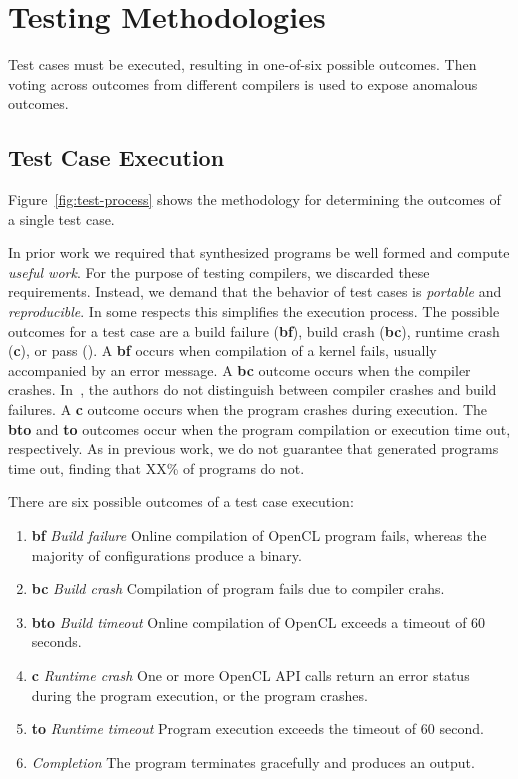 \section{Testing Methodologies}\label{sec:methodology}

Test cases must be executed, resulting in one-of-six possible outcomes. Then voting across outcomes from different compilers is used to expose anomalous outcomes.


\subsection{Test Case Execution}



Figure~\ref{fig:test-process} shows the methodology for determining the outcomes of a single test case.

In prior work we required that synthesized programs be well formed and compute \emph{useful work}. For the purpose of testing compilers, we discarded these requirements. Instead, we demand that the behavior of test cases is \emph{portable} and \emph{reproducible}. In some respects this simplifies the execution process. The possible outcomes for a test case are a build failure (\textbf{bf}), build crash (\textbf{bc}), runtime crash (\textbf{c}), or pass (\textbf{\cmark}). A \textbf{bf} occurs when compilation of a kernel fails, usually accompanied by an error message. A \textbf{bc} outcome occurs when the compiler crashes. In~\cite{Lidbury2015a}, the authors do not distinguish between compiler crashes and build failures. A \textbf{c} outcome occurs when the program crashes during execution. The \textbf{bto} and \textbf{to} outcomes occur when the program compilation or execution time out, respectively. As in previous work, we do not guarantee that generated programs time out, finding that XX\% of programs do not.

There are six possible outcomes of a test case execution:
%
\begin{enumerate}
	\item \textbf{bf} \emph{Build failure} Online compilation of OpenCL program fails, whereas the majority of configurations produce a binary.
	\item \textbf{bc} \emph{Build crash} Compilation of program fails due to compiler crahs.
	\item \textbf{bto} \emph{Build timeout} Online compilation of OpenCL exceeds a timeout of 60 seconds.
	\item \textbf{c} \emph{Runtime crash} One or more OpenCL API calls return an error status during the program execution, or the program crashes.
	\item \textbf{to} \emph{Runtime timeout} Program execution exceeds the timeout of 60 second.
	\item \textbf{\cmark} \emph{Completion} The program terminates gracefully and produces an output.
\end{enumerate}


